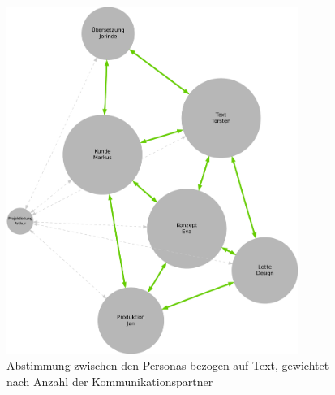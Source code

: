 \begin{figure}[htb]
\begin{center}
\includegraphics[width=0.85\textwidth]{media/personas-gewichtet.pdf}
\caption{Abstimmung zwischen den Personas bezogen auf Text, gewichtet nach Anzahl der Kommunikationspartner}
\label{chart:personas-gewichtet}
\end{center}
\end{figure}